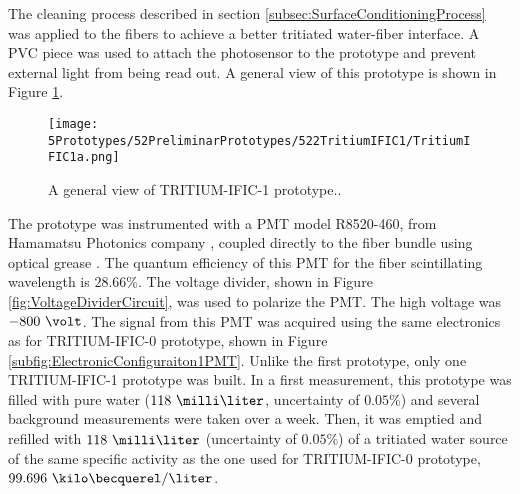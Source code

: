 The cleaning process described in section \ref{subsec:SurfaceConditioningProcess} was applied to the fibers to achieve a better tritiated water-fiber interface. A PVC piece was used to attach the photosensor to the prototype and prevent external light from being read out. A general view of this prototype is shown in Figure \ref{fig:TritumIFIC1}.

\begin{figure}[h]
\centering
\texttt{[image: 5Prototypes/52PreliminarPrototypes/522TritiumIFIC1/TritiumIFIC1a.png]}
\caption{A general view of TRITIUM-IFIC-1 prototype..\label{fig:TritumIFIC1}}
\end{figure}



The prototype was instrumented with a PMT model R8520-460, from Hamamatsu Photonics company \cite{DataSheetPMTs}, coupled directly to the fiber bundle using optical grease \cite{OpticalGrease}. The quantum efficiency of this PMT for the fiber scintillating wavelength is $28.66\%$.  The voltage divider, shown in Figure \ref{fig:VoltageDividerCircuit}, was used to polarize the PMT. The high voltage was $-800~\volt$. The signal from this PMT was acquired using the same electronics as for TRITIUM-IFIC-0 prototype, shown in Figure \ref{subfig:ElectronicConfiguraiton1PMT}. Unlike the first prototype, only one TRITIUM-IFIC-1 prototype was built. In a first measurement, this prototype was filled with pure water ($118~\milli\liter$, uncertainty of $0.05\%$) and several background measurements were taken over a week. Then, it was emptied and refilled with $118~\milli\liter$ (uncertainty of $0.05\%$) of a tritiated water source of the same specific activity as the one used for TRITIUM-IFIC-0 prototype, $99.696~\kilo\becquerel/\liter$. 

